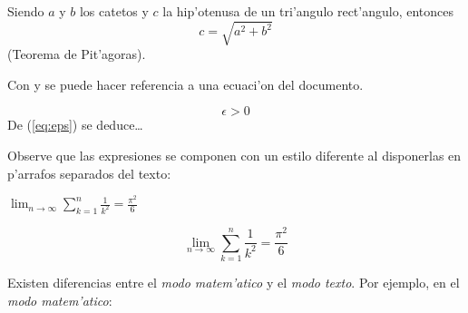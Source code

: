 \begin{example}
Siendo $a$ y $b$ los catetos
y $c$ la hip'otenusa
de un tri'angulo rect'angulo,
entonces
\begin{displaymath}
c = \sqrt{  a^{2}+b^{2}  }
\end{displaymath}
(Teorema de Pit'agoras).
\end{example}

Con  y  se puede hacer referencia a una
ecuaci'on del documento.

\begin{example}
\begin{equation} \label{eq:eps}
\epsilon > 0
\end{equation}
De (\ref{eq:eps}) se deduce\ldots
\end{example}

Observe que las expresiones se componen con un estilo diferente al
disponerlas en p'arrafos separados del texto:

\begin{example}
$\lim_{n \to \infty}
\sum_{k=1}^n \frac{1}{k^2}
= \frac{\pi^2}{6}$
\end{example}
\begin{example}
\begin{displaymath}
\lim_{n \to \infty}
\sum_{k=1}^n \frac{1}{k^2}
= \frac{\pi^2}{6}
\end{displaymath}
\end{example}


Existen diferencias entre el \emph{modo matem'atico} y el \emph{modo
  texto}. Por ejemplo, en el \emph{modo matem'atico}:

